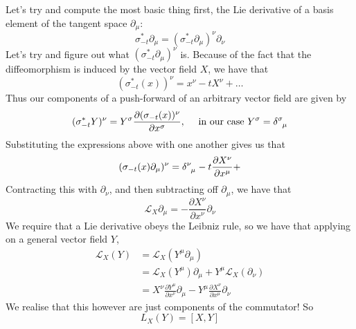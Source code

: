 Let's try and compute the most basic thing first, the Lie derivative of a basis element of the tangent space  $\partial_\mu$: 
\[
\sigma_{ -t}^* \partial_\mu = (\sigma_{ -t}^* \partial_\mu)^\nu \partial_\nu
\] Let's try and figure out what $ (\sigma_{ -t}^* \partial_\mu)^\nu$ is. Because of the fact that the diffeomorphism is induced by the vector field $X$, we have that 
\[
( \sigma_{ -t}^* (x))^\nu = x^\nu  - t X^\nu + \dots
\] Thus our components of a push-forward of an arbitrary vector field are given by 
\[ 
( \sigma_{ -t}^*  Y )^\nu  = Y^\sigma \frac{ \partial ( \sigma_{ -t } ( x) )^\nu}{ \partial x^\sigma } , \quad \text{ in our case }  Y^\sigma = \delta\indices{^\sigma_\mu} 
\] 
Substituting the expressions above with one another gives us that 
\[ 
( \sigma_{ -t} ( x) \partial_\mu )^\nu  = \delta\indices{^\nu_\mu}  - t \frac{ \partial X^\nu }{ \partial x^\mu } + 
\] Contracting this with $\partial_\nu$, and then subtracting off $\partial_\mu$, we have that
\[ 
\mathcal{L}_X \partial_\mu =  - \frac{ \partial X^\nu}{ \partial x^\nu} \partial_\nu 
\] We require that a Lie derivative obeys the Leibniz rule, so we have that applying on a general vector field $Y$, 
\begin{align*}
\mathcal{L}_X (Y)  & = \mathcal{L}_X( Y^\mu \partial_\mu ) \\
				&= \mathcal{L}_X ( Y^\mu ) \partial_\mu + Y^\mu \mathcal{L}_X ( \partial_\nu ) \\
				&= X^\nu \frac{ \partial Y^\mu }{ \partial x^\nu } \partial_\mu - Y^\mu \frac{ \partial X^\nu } { \partial x^\mu } \partial_\nu 
\end{align*} 
We realise that this however are just components of the commutator! So
\[
L_X ( Y ) = [ X, Y ] 
\] 

